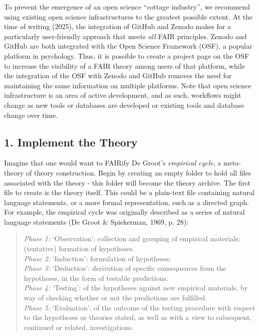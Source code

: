 \documentclass[
  man, noextraspace,floatsintext]{apa7}
\begin{document}
To prevent the emergence of an open science ``cottage industry'',
we recommend using existing open science infrastructures to the greatest possible extent.
At the time of writing (2025),
the integration of GitHub and Zenodo makes for a particularly user-friendly approach that meets \emph{all} FAIR principles.
Zenodo and GitHub are both integrated with the Open Science Framework (OSF),
a popular platform in psychology.
Thus, it is possible to create a project page on the OSF to increase the visibility of a FAIR theory among users of that platform,
while the integration of the OSF with Zenodo and GitHub removes the need for maintaining the same information on multiple platforms.
Note that open science infrastructure is an area of active development, and as such,
workflows might change as new tools or databases are developed or existing tools and database change over time.

\subsection{1. Implement the Theory}\label{implement-the-theory}

Imagine that one would want to FAIRify De Groot's \emph{empirical cycle},
a meta-theory of theory construction.
Begin by creating an empty folder to hold all files associated with the theory - this folder will become the theory archive.
The first file to create is the theory itself.
This could be a plain-text file containing natural language statements,
or a more formal representation, such as a directed graph.
For example, the empirical cycle was originally described as a series of natural language statements (De Groot \& Spiekerman, 1969, p. 28):

\begin{quote}
\emph{Phase 1:} `Observation': collection and grouping of empirical materials; (tentative) formation of hypotheses.\\
\emph{Phase 2:} `Induction': formulation of hypotheses.\\
\emph{Phase 3:} `Deduction': derivation of specific consequences from the hypotheses, in the form of testable predictions.\\
\emph{Phase 4:} `Testing': of the hypotheses against new empirical materials, by way of checking whether or not the predictions are fulfilled.\\
\emph{Phase 5:} `Evaluation': of the outcome of the testing procedure with respect to the hypotheses or theories stated, as well as with a view to subsequent, continued or related, investigations.
\end{quote}
\end{document}
